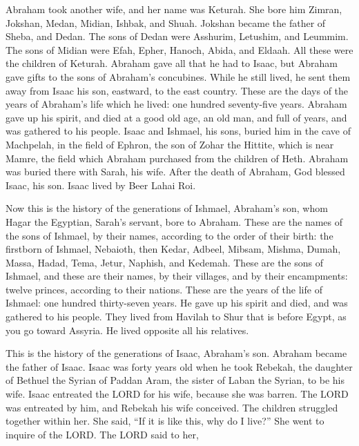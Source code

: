 \mychapter{}
\myverse*{}Abraham took another wife, and her name was Keturah. \myverse{}She bore him Zimran, Jokshan, Medan, Midian, Ishbak, and Shuah. \myverse{}Jokshan became the father of Sheba, and Dedan. The sons of Dedan were Asshurim, Letushim, and Leummim. \myverse{}The sons of Midian were Efah, Epher, Hanoch, Abida, and Eldaah. All these were the children of Keturah. \myverse{}Abraham gave all that he had to Isaac, \myverse{}but Abraham gave gifts to the sons of Abraham’s concubines. While he still lived, he sent them away from Isaac his son, eastward, to the east country. \myverse{}These are the days of the years of Abraham’s life which he lived: one hundred seventy-five years. \myverse{}Abraham gave up his spirit, and died at a good old age, an old man, and full of years, and was gathered to his people. \myverse{}Isaac and Ishmael, his sons, buried him in the cave of Machpelah, in the field of Ephron, the son of Zohar the Hittite, which is near Mamre, \myverse{}the field which Abraham purchased from the children of Heth. Abraham was buried there with Sarah, his wife. \myverse{}After the death of Abraham, God blessed Isaac, his son. Isaac lived by Beer Lahai Roi.

\myverse{}Now this is the history of the generations of Ishmael, Abraham’s son, whom Hagar the Egyptian, Sarah’s servant, bore to Abraham. \myverse{}These are the names of the sons of Ishmael, by their names, according to the order of their birth: the firstborn of Ishmael, Nebaioth, then Kedar, Adbeel, Mibsam, \myverse{}Mishma, Dumah, Massa, \myverse{}Hadad, Tema, Jetur, Naphish, and Kedemah. \myverse{}These are the sons of Ishmael, and these are their names, by their villages, and by their encampments: twelve princes, according to their nations. \myverse{}These are the years of the life of Ishmael: one hundred thirty-seven years. He gave up his spirit and died, and was gathered to his people. \myverse{}They lived from Havilah to Shur that is before Egypt, as you go toward Assyria. He lived opposite all his relatives.

\myverse{}This is the history of the generations of Isaac, Abraham’s son. Abraham became the father of Isaac. \myverse{}Isaac was forty years old when he took Rebekah, the daughter of Bethuel the Syrian of Paddan Aram, the sister of Laban the Syrian, to be his wife. \myverse{}Isaac entreated the LORD for his wife, because she was barren. The LORD was entreated by him, and Rebekah his wife conceived. \myverse{}The children struggled together within her. She said, “If it is like this, why do I live?” She went to inquire of the LORD. \myverse{}The LORD said to her,

